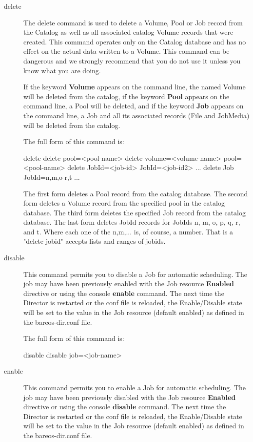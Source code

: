 \begin{description}
\item [delete]
   The delete command is used to delete a Volume, Pool or Job record from
   the Catalog as well as all associated catalog Volume records that were
   created.  This command operates only on the Catalog database and has no
   effect on the actual data written to a Volume.  This command can be
   dangerous and we strongly recommend that you do not use it unless you
   know what you are doing.

   If the keyword {\bf Volume} appears on the command line, the named
   Volume will be deleted from the catalog, if the keyword {\bf Pool}
   appears on the command line, a Pool will be deleted, and if the keyword
   {\bf Job} appears on the command line, a Job and all its associated
   records (File and JobMedia) will be deleted from the catalog.

   The full form of this command is:

\begin{bconsole}{delete}
delete pool=<pool-name>
delete volume=<volume-name> pool=<pool-name>
delete JobId=<job-id> JobId=<job-id2> ...
delete Job JobId=n,m,o-r,t ...
\end{bconsole}

   The first form deletes a Pool record from the catalog database.  The
   second form deletes a Volume record from the specified pool in the
   catalog database.  The third form deletes the specified Job record from
   the catalog database.  The last form deletes JobId records for JobIds
   n, m, o, p, q, r, and t.  Where each one of the n,m,...  is, of course, a
   number. That is a "delete jobid" accepts lists and ranges of
   jobids.

\item [disable]
  This command permits you to disable a Job for automatic scheduling.
  The job may have been previously enabled with the Job resource
  {\bf Enabled} directive or using the console {\bf enable} command.
  The next time the Director is restarted or the conf file is reloaded,
  the Enable/Disable state will be set to the value in the Job resource
  (default enabled) as defined in the bareos-dir.conf file.

   The full form of this command is:
\begin{bconsole}{disable}
disable job=<job-name>
\end{bconsole}

\item [enable]
  This command permits you to enable a Job for automatic scheduling.
  The job may have been previously disabled with the Job resource
  {\bf Enabled} directive or using the console {\bf disable} command.
  The next time the Director is restarted or the conf file is reloaded,
  the Enable/Disable state will be set to the value in the Job resource
  (default enabled) as defined in the bareos-dir.conf file.


\end{description}
